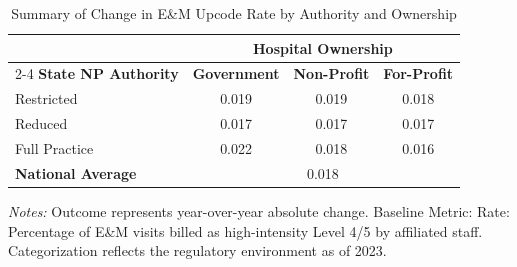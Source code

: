 \begin{table}[htbp]
    \centering
    \caption{Summary of Change in E\&M Upcode Rate by Authority and Ownership}
    \label{tab:d_partb_em_upcode_rate_own}
    \vspace{0.2cm}
    \begin{tabular}{lccc}
        \toprule
        & \multicolumn{3}{c}{\textbf{Hospital Ownership}} \\
        \cmidrule(lr){2-4}
        \textbf{State NP Authority} & \textbf{Government} & \textbf{Non-Profit} & \textbf{For-Profit} \\
        \midrule
        Restricted & 0.019 & 0.019 & 0.018 \\
        Reduced & 0.017 & 0.017 & 0.017 \\
        Full Practice & 0.022 & 0.018 & 0.016 \\
        \midrule
        \textbf{National Average} & \multicolumn{3}{c}{0.018} \\
        \bottomrule
    \end{tabular}
    \vspace{0.1cm}
    \begin{minipage}{0.85\textwidth}
        \footnotesize \textit{Notes:} Outcome represents year-over-year absolute change. Baseline Metric: Rate: Percentage of E\&M visits billed as high-intensity Level 4/5 by affiliated staff. Categorization reflects the regulatory environment as of 2023.
    \end{minipage}
\end{table}